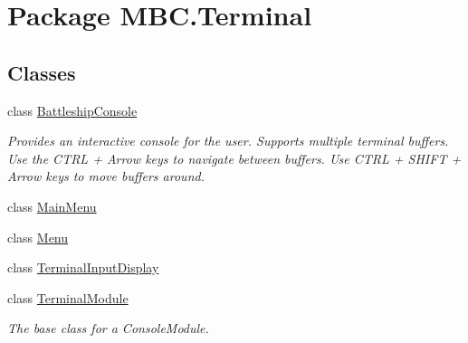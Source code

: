 \hypertarget{namespace_m_b_c_1_1_terminal}{\section{Package M\-B\-C.\-Terminal}
\label{namespace_m_b_c_1_1_terminal}
}
\subsection*{Classes}
\begin{DoxyCompactItemize}
\item 
class \hyperlink{class_m_b_c_1_1_terminal_1_1_battleship_console}{Battleship\-Console}
\begin{DoxyCompactList}\small\item\em Provides an interactive console for the user. Supports multiple terminal buffers. Use the C\-T\-R\-L + Arrow keys to navigate between buffers. Use C\-T\-R\-L + S\-H\-I\-F\-T + Arrow keys to move buffers around.\end{DoxyCompactList}\item 
class \hyperlink{class_m_b_c_1_1_terminal_1_1_main_menu}{Main\-Menu}
\item 
class \hyperlink{class_m_b_c_1_1_terminal_1_1_menu}{Menu}
\item 
class \hyperlink{class_m_b_c_1_1_terminal_1_1_terminal_input_display}{Terminal\-Input\-Display}
\item 
class \hyperlink{class_m_b_c_1_1_terminal_1_1_terminal_module}{Terminal\-Module}
\begin{DoxyCompactList}\small\item\em The base class for a Console\-Module.\end{DoxyCompactList}\end{DoxyCompactItemize}

